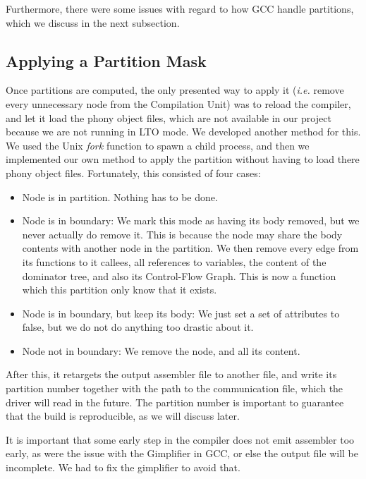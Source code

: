 \documentclass[runningheads]{llncs}
\begin{document}
Furthermore, there were some issues with
regard to how GCC handle partitions, which we discuss in the next subsection.

\subsection{Applying a Partition Mask}

Once partitions are computed, the only presented way to apply it (\textit{i.e.}
remove every unnecessary node from the Compilation Unit) was to reload the
compiler, and let it load the phony object files, which are not available in our
project because we are not running in LTO mode. We developed another method for this.
We used the Unix \textit{fork} function to spawn a child process, and then
we implemented our own method to apply the partition without having to load
there phony object files. Fortunately, this consisted
of four cases:
\begin{itemize}
	\item Node is in partition. Nothing has to be done.
	\item Node is in boundary: We mark this mode as having its body removed,
	but we never actually do remove it. This is because the node may share the
	body contents with another node in the partition. We then remove
	every edge from its functions to it callees, all references to variables,
	the content of the dominator tree, and also its Control-Flow Graph. This
	is now a function which this partition only know that it exists.
	
	\item Node is in boundary, but keep its body: We just set a set of
	attributes to false, but we do not do anything too drastic about it.

	\item Node not in boundary: We remove the node, and all its content.
\end{itemize}

After this, it retargets the output assembler file to another file,
and write its partition number together with the path to the communication
file, which the driver will read in the future. The partition number is
important to guarantee that the build is reproducible, as we will discuss
later.

It is important that some early step in the compiler does not emit assembler
too early, as were the issue with the Gimplifier in GCC, or else the output
file will be incomplete. We had to fix the gimplifier to avoid that.
\end{document}
